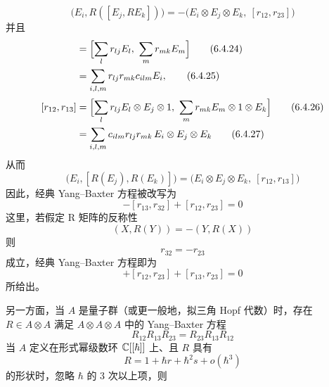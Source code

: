 \begin{equation}
  \bigl(E_i, R([E_j,RE_k])\bigr) = -\bigl(E_i\otimes E_j\otimes E_k,\ [r_{12},r_{23}]\bigr)
  \tag{6.4.23}
\end{equation}
并且
\begin{align}
  [R(E_j),R(E_k)] &= \Bigl[\sum_l r_{lj}E_l,\ \sum_m r_{mk}E_m\Bigr] \tag{6.4.24}\\
  &= \sum_{i,l,m} r_{lj}r_{mk}c_{ilm}E_i, \tag{6.4.25}\\[2pt]
  [r_{12},r_{13}]
  &= \Bigl[\sum_l r_{lj}E_l\otimes E_j\otimes 1,\ \sum_m r_{mk}E_m\otimes 1\otimes E_k\Bigr] \tag{6.4.26}\\
  &= \sum_{i,l,m} c_{ilm}r_{lj}r_{mk}\,E_i\otimes E_j\otimes E_k \tag{6.4.27}
\end{align}
从而
\begin{equation}
  \bigl(E_i,[R(E_j),R(E_k)]\bigr) = \bigl(E_i\otimes E_j\otimes E_k,\ [r_{12},r_{13}]\bigr)
  \tag{6.4.28}
\end{equation}
因此，经典 Yang--Baxter 方程被改写为
\begin{equation}
  [r_{12},r_{13}] - [r_{13},r_{32}] + [r_{12},r_{23}] = 0
  \tag{6.4.29}
\end{equation}
这里，若假定 R 矩阵的反称性
\begin{equation}
  (X,R(Y)) = -(Y,R(X))
  \tag{6.4.30}
\end{equation}
则
\begin{equation}
  r_{32} = -r_{23}
  \tag{6.4.31}
\end{equation}
成立，经典 Yang--Baxter 方程即为
\begin{equation}
  [r_{12},r_{13}] + [r_{12},r_{23}] + [r_{13},r_{23}] = 0
  \tag{6.4.32}
\end{equation}
所给出。

另一方面，当 $A$ 是量子群（或更一般地，拟三角 Hopf 代数）时，存在 $R\in A\otimes A$ 满足 $A\otimes A\otimes A$ 中的 Yang--Baxter 方程
\begin{equation}
  R_{12}R_{13}R_{23} = R_{23}R_{13}R_{12}
  \tag{6.4.33}
\end{equation}
当 $A$ 定义在形式幂级数环 $\mathbb{C}[[\hbar]]$ 上、且 $R$ 具有
\begin{equation}
  R = 1 + \hbar r + \hbar^2 s + o(\hbar^3)
  \tag{6.4.34}
\end{equation}
的形状时，忽略 $\hbar$ 的 3 次以上项，则


